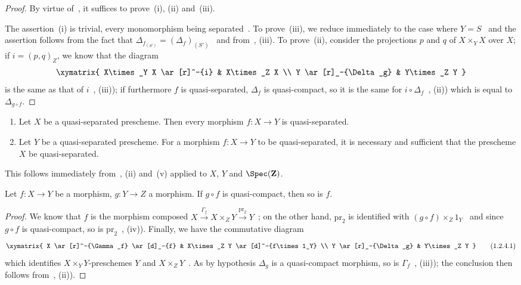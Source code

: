 \begin{proof}
By virtue of~, it suffices to prove~(i), (ii) and~(iii).

The assertion~(i) is trivial, every monomorphism being separated~. To
prove~(iii), we reduce immediately to the case where $Y=S$~ and the assertion follows
from the fact that $\Delta_{f_{(S')}}=(\Delta_f)_{(S')}$~ and from~, (iii). To prove~(ii), consider
the projections $p$ and $q$ of $X\times_Y X$ over $X$; if $i=(p,q)_Z$, we know that the diagram
\[
\xymatrix{
  X\times_Y X \ar[r]^-{i} & X\times_Z X \\
  Y \ar[r]_-{\Delta_g} & Y\times_Z Y
}
\]
is the same as that of $i$~, (iii)); if furthermore $f$ is quasi-separated, $\Delta_f$ is quasi-compact,
so it is the same for $i\circ\Delta_f$~, (ii)) which is equal to $\Delta_{g\circ f}$.
\end{proof}

\begin{corollary}[1.2.3]
\label{IV.1.2.3}
\medskip\noindent
\begin{enumerate}[label=(\roman*)]
  \item Let $X$ be a quasi-separated prescheme. Then every morphism $f:X\to Y$
    is quasi-separated.
  \item Let $Y$ be a quasi-separated prescheme. For a morphism $f:X\to Y$ to be quasi-separated,
    it is necessary and sufficient that the prescheme $X$ be quasi-separated.
\end{enumerate}
\end{corollary}

This follows immediately from~, (ii) and~(v) applied to $X$, $Y$ and $\Spec(\mathbf{Z})$.

\begin{proposition}[1.2.4]
\label{IV.1.2.4}
Let $f:X\to Y$ be a morphism, $g:Y\to Z$ a morphism.
If $g\circ f$ is quasi-compact, then so is $f$.
\end{proposition}

\begin{proof}
We know that $f$ is the morphism composed $X\xrightarrow{\Gamma_f} X\times_Z Y\xrightarrow{\mathrm{pr}_2} Y$~; on the other hand,
$\mathrm{pr}_2$ is identified with $(g\circ f)\times_Z 1_Y$~ and since $g\circ f$ is quasi-compact, so is
$\mathrm{pr}_2$~, (iv)). Finally, we have the commutative diagram
\[
\xymatrix{
  X \ar[r]^-{\Gamma_f} \ar[d]_-{f} & X\times_Z Y \ar[d]^-{f\times 1_Y} \\
  Y \ar[r]_-{\Delta_g} & Y\times_Z Y
}
\tag{1.2.4.1}
\]
which identifies $X\times_Y Y$-preschemes $Y$ and $X\times_Z Y$~. As
by hypothesis $\Delta_g$ is a quasi-compact morphism, so is $\Gamma_f$~, (iii));
the conclusion then follows from~, (ii)).
\end{proof}

